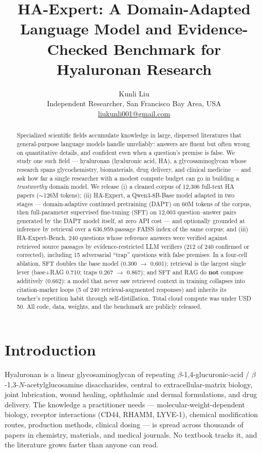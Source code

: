 \documentclass[11pt]{article}
\title{HA-Expert: A Domain-Adapted Language Model and Evidence-Checked
Benchmark for Hyaluronan Research}
\author{Kunli Liu\\
Independent Researcher, San Francisco Bay Area, USA\\
\href{mailto:liukunli001@gmail.com}{liukunli001@gmail.com}}
\date{}
\begin{document}
\maketitle

\begin{abstract}
Specialized scientific fields accumulate knowledge in large, dispersed
literatures that general-purpose language models handle unreliably: answers
are fluent but often wrong on quantitative details, and confident even when
a question's premise is false. We study one such field --- hyaluronan
(hyaluronic acid, HA), a glycosaminoglycan whose research spans
glycochemistry, biomaterials, drug delivery, and clinical medicine --- and
ask how far a single researcher with a modest compute budget can go in
building a \emph{trustworthy} domain model. We release (i) a cleaned
corpus
of 12,306 full-text HA papers ($\sim$126M tokens); (ii) HA-Expert, a
Qwen3-8B-Base model adapted in two stages --- domain-adaptive continued
pretraining (DAPT) on 60M tokens of the corpus, then full-parameter
supervised fine-tuning (SFT) on 12,003 question--answer pairs generated by
the DAPT model itself, at zero API cost --- and optionally grounded at
inference by retrieval over a 636,959-passage FAISS index of the same
corpus; and (iii) HA-Expert-Bench, 240 questions whose reference answers
were verified against retrieved source passages by evidence-restricted LLM
verifiers (212 of 240 confirmed or corrected), including 15
adversarial ``trap'' questions with false premises. In a four-cell
ablation, SFT doubles the base model (0.300 $\rightarrow$ 0.601);
retrieval is the largest single lever (base+RAG 0.710; traps
0.267 $\rightarrow$ 0.867); and SFT and RAG do \textbf{not}
compose additively (0.662): a model that never saw retrieved context in
training collapses into citation-marker loops (5 of 240
retrieval-augmented responses) and inherits its teacher's repetition
habit through self-distillation. Total cloud compute was under USD 50.
All code, data, weights, and the benchmark are publicly released.
\end{abstract}

\section{Introduction}
\label{sec:intro}

Hyaluronan is a linear glycosaminoglycan of repeating
$\beta$-1,4-glucuronic-acid / $\beta$-1,3-$N$-acetylglucosamine
disaccharides, central to extracellular-matrix biology, joint lubrication,
wound healing, ophthalmic and dermal formulations, and drug delivery.
The knowledge a practitioner needs ---
molecular-weight-dependent biology, receptor interactions (CD44, RHAMM,
LYVE-1), chemical modification routes, production methods, clinical
dosing --- is spread across thousands of papers in chemistry, materials,
and medical journals. No textbook tracks it, and the literature grows
faster than anyone can read.
\end{document}
